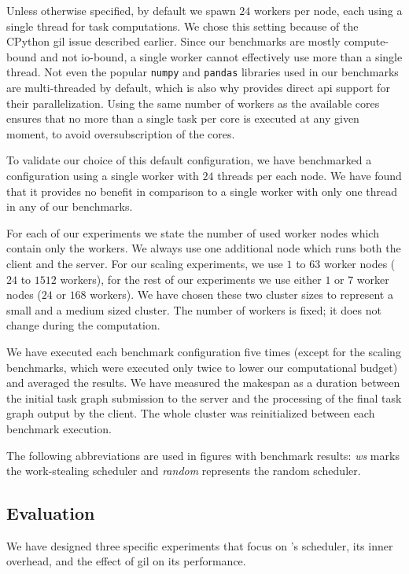 Unless otherwise specified, by default we spawn $24$
\dask{} workers per node, each using a single thread for task computations. We
chose this setting because of the CPython \gls{gil} issue described earlier.
Since our benchmarks are mostly compute-bound and not \gls{io}-bound, a single
worker cannot effectively use more than a single thread. Not even the popular
\texttt{numpy} and \texttt{pandas} libraries used in our benchmarks are
multi-threaded by default, which is also why \dask{} provides direct
\gls{api} support for their parallelization. Using the same number of workers as
the available cores ensures that no more than a single task per core is executed at any given
moment, to avoid oversubscription of the cores.

To validate our choice of this default configuration, we have benchmarked a configuration using a
single worker with $24$ threads per each node. We have found that it provides
no benefit in comparison to a single worker with only one thread in any of our benchmarks.

For each of our experiments we state the number of used worker nodes which contain only the
workers. We always use one additional node which runs both the client and the server. For our
scaling experiments, we use $1$ to $63$ worker nodes
($24$ to $1512$ \dask{} workers), for
the rest of our experiments we use either $1$ or $7$
worker nodes ($24$ or $168$ \dask{}
workers). We have chosen these two cluster sizes to represent a small and a medium sized
\dask{} cluster. The number of workers is fixed; it does not change during the
computation.

We have executed each benchmark configuration five times (except for the scaling benchmarks, which
were executed only twice to lower our computational budget) and averaged the results. We have
measured the makespan as a duration between the initial task graph submission to the server and the
processing of the final task graph output by the client. The whole cluster was reinitialized
between each benchmark execution.

The following abbreviations are used in figures with benchmark results: \emph{ws}
marks the work-stealing scheduler and \emph{random} represents the random scheduler.

\subsection{Evaluation}
\label{dask:evaluation}
We have designed three specific experiments that focus on \dask{}'s scheduler,
its inner overhead, and the effect of \gls{gil} on its performance.

